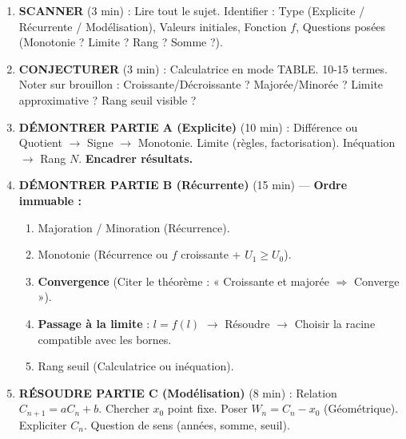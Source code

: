 \documentclass[11pt]{article}
\begin{document}
\begin{methode}
\begin{enumerate}
    \item \textbf{SCANNER} (3 min) : Lire tout le sujet. Identifier : Type (Explicite / Récurrente / Modélisation), Valeurs initiales, Fonction $f$, Questions posées (Monotonie ? Limite ? Rang ? Somme ?).
    \item \textbf{CONJECTURER} (3 min) : Calculatrice en mode TABLE. 10-15 termes. Noter sur brouillon : Croissante/Décroissante ? Majorée/Minorée ? Limite approximative ? Rang seuil visible ?
    \item \textbf{DÉMONTRER PARTIE A (Explicite)} (10 min) : Différence ou Quotient $\rightarrow$ Signe $\rightarrow$ Monotonie. Limite (règles, factorisation). Inéquation $\rightarrow$ Rang $N$. \textbf{Encadrer résultats.}
    \item \textbf{DÉMONTRER PARTIE B (Récurrente)} (15 min) — \textbf{Ordre immuable :}
        \begin{enumerate}
            \item Majoration / Minoration (Récurrence).
            \item Monotonie (Récurrence ou $f$ croissante + $U_1 \ge U_0$).
            \item \textbf{Convergence} (Citer le théorème : « Croissante et majorée $\Rightarrow$ Converge »).
            \item \textbf{Passage à la limite} : $l = f(l)$ $\rightarrow$ Résoudre $\rightarrow$ Choisir la racine compatible avec les bornes.
            \item Rang seuil (Calculatrice ou inéquation).
        \end{enumerate}
    \item \textbf{RÉSOUDRE PARTIE C (Modélisation)} (8 min) : Relation $C_{n+1} = a C_n + b$. Chercher $x_0$ point fixe. Poser $W_n = C_n - x_0$ (Géométrique). Expliciter $C_n$. Question de sens (années, somme, seuil).
\end{enumerate}
\end{methode}
\end{document}
